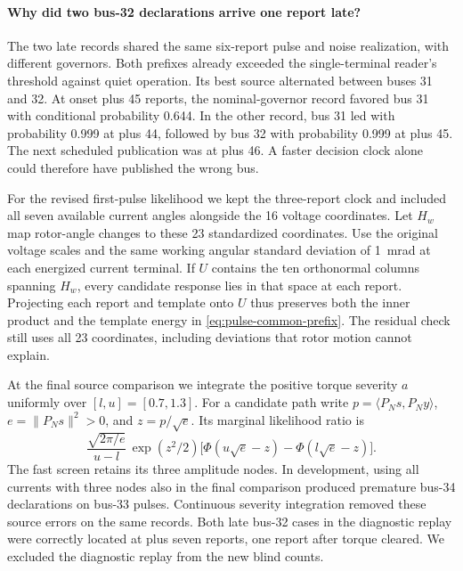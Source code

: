 \paragraph{Why did two bus-32 declarations arrive one report late?}
The two late records shared the same six-report pulse and noise
realization, with different governors. Both prefixes already exceeded
the single-terminal reader's threshold against quiet operation. Its best
source alternated between buses 31 and 32. At onset plus 45 reports,
the nominal-governor record favored bus 31 with conditional probability
0.644. In the other record, bus 31 led with probability 0.999 at
plus 44, followed by bus 32 with probability 0.999 at plus 45.
The next scheduled publication was at plus 46. A faster decision clock
alone could therefore have published the wrong bus.

For the revised first-pulse likelihood we kept the three-report clock
and included all seven available current angles alongside the 16
voltage coordinates. Let $H_w$ map rotor-angle changes to these
23 standardized coordinates. Use the original voltage scales and
the same working angular standard deviation of 1~mrad at each
energized current terminal. If $U$ contains the ten orthonormal
columns spanning $H_w$, every candidate response lies in that space
at each report. Projecting each report and template onto $U$ thus
preserves both the inner product and the template energy in
\eqref{eq:pulse-common-prefix}. The residual check still uses all 23
coordinates, including deviations that rotor motion cannot explain.

At the final source comparison we integrate the positive torque
severity $a$ uniformly over $[l,u]=[0.7,1.3]$. For a candidate path
write $p=\langle P_N s,P_N y\rangle$, $e=\|P_N s\|^2>0$, and
$z=p/\sqrt e$. Its marginal likelihood ratio is
\[
 \frac{\sqrt{2\pi/e}}{u-l}\,\exp(z^2/2)
 \big[\Phi(u\sqrt e-z)-\Phi(l\sqrt e-z)\big].
\]
The fast screen retains its three amplitude nodes. In development,
using all currents with three nodes also in the final comparison
produced premature bus-34 declarations on bus-33 pulses. Continuous
severity integration removed these source errors on the same
records. Both late bus-32 cases in the diagnostic replay were
correctly located at plus seven reports, one report after torque
cleared. We excluded the diagnostic replay from the new blind counts.

